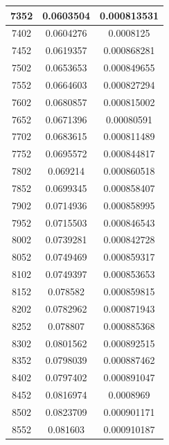 \documentclass{article}
\begin{document}
\begin{longtable}{|c|c|c|}
		7352	&  0.0603504  	 &  0.000813531  \\ \hline                  
		7402	&  0.0604276  	 &  0.0008125    \\ \hline                
		7452	&  0.0619357  	 &  0.000868281  \\ \hline                  
		7502	&  0.0653653  	 &  0.000849655  \\ \hline                  
		7552	&  0.0664603  	 &  0.000827294  \\ \hline                  
		7602	&  0.0680857  	 &  0.000815002  \\ \hline                  
		7652	&  0.0671396  	 &  0.00080591   \\ \hline                 
		7702	&  0.0683615  	 &  0.000811489  \\ \hline                  
		7752	&  0.0695572  	 &  0.000844817  \\ \hline                  
		7802	&  0.069214   	 &  0.000860518  \\ \hline                  
		7852	&  0.0699345  	 &  0.000858407  \\ \hline                  
		7902	&  0.0714936  	 &  0.000858995  \\ \hline                  
		7952	&  0.0715503  	 &  0.000846543  \\ \hline                  
		8002	&  0.0739281  	 &  0.000842728  \\ \hline                  
		8052	&  0.0749469  	 &  0.000859317  \\ \hline                  
		8102	&  0.0749397  	 &  0.000853653  \\ \hline                  
		8152	&  0.078582   	 &  0.000859815  \\ \hline                  
		8202	&  0.0782962  	 &  0.000871943  \\ \hline                  
		8252	&  0.078807   	 &  0.000885368  \\ \hline                  
		8302	&  0.0801562  	 &  0.000892515  \\ \hline                  
		8352	&  0.0798039  	 &  0.000887462  \\ \hline                  
		8402	&  0.0797402  	 &  0.000891047  \\ \hline                  
		8452	&  0.0816974  	 &  0.0008969    \\ \hline                
		8502	&  0.0823709  	 &  0.000901171  \\ \hline                  
		8552	&  0.081603   	 &  0.000910187  \\ \hline                  

\end{longtable}
\end{document}
